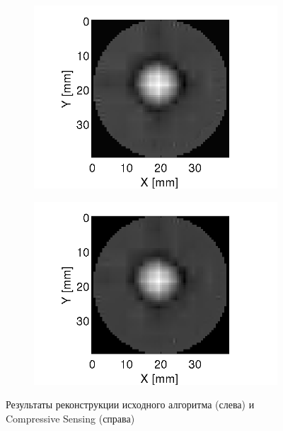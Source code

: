 \documentclass[14pt]{matmex-diploma}
\begin{document}
\begin{figure}
\centering
\begin{subfigure}{.45\textwidth}
    \centering
    \includegraphics[width=1\linewidth]{pics/slice_base_grad.png}
\end{subfigure}
\begin{subfigure}{.45\textwidth}
    \centering
    \includegraphics[width=1\linewidth]{pics/slice_cs_grad.png}
\end{subfigure}
    \caption{Результаты реконструкции исходного алгоритма (слева) и Compressive Sensing (справа)}
    \label{fig:reconstruction_exp1}
\end{figure}
\end{document}
